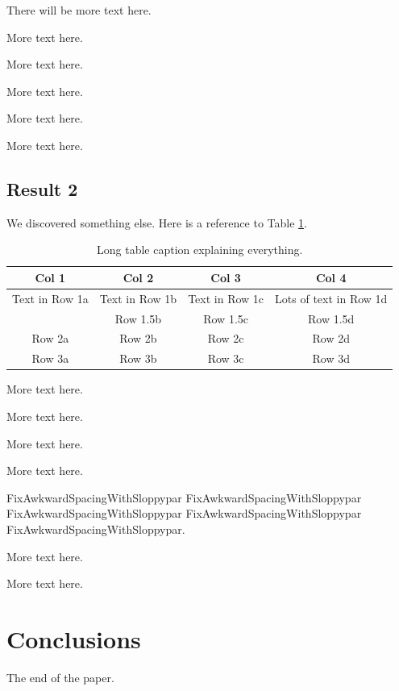 There will be more text here.

More text here.

More text here.

More text here.

More text here.

More text here.

\subsection{Result 2}
We discovered something else. Here is a reference to Table \ref{tab:paper1_tab1}.

\renewcommand{\arraystretch}{2}  %
\begin{table}[hbt!]
\centering
\begin{tabularx}{\textwidth}{c|c|c|c}  %
   \textbf{Col 1} & \textbf{Col 2} & \textbf{Col 3} & \textbf{Col 4} \\
   \hline  %
   Text in Row 1a & Text in Row 1b & Text in Row 1c & Lots of text in Row 1d \\
                  & Row 1.5b & Row 1.5c & Row 1.5d \\
   \hline
   Row 2a & Row 2b & Row 2c & Row 2d \\
   \hline
   Row 3a & Row 3b & Row 3c & Row 3d \\
\end{tabularx}
\caption[Short table caption for List of Tables]{Long table caption explaining everything.}
\label{tab:paper1_tab1}
\end{table}

More text here.

More text here.

More text here.

More text here.

\begin{sloppypar}
FixAwkwardSpacingWithSloppypar FixAwkwardSpacingWithSloppypar FixAwkwardSpacingWithSloppypar FixAwkwardSpacingWithSloppypar FixAwkwardSpacingWithSloppypar.
\end{sloppypar}

More text here.

More text here.

\section{Conclusions}
The end of the paper.
